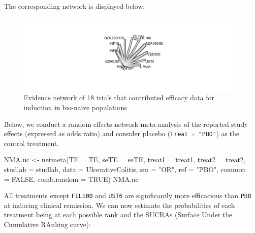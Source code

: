 \documentclass[
  letterpaper,
  DIV=11,
  numbers=noendperiod]{scrreprt}
\newenvironment{Shaded}{\begin{snugshade}}{\end{snugshade}}
\newcommand{\AttributeTok}[1]{\textcolor[rgb]{0.40,0.45,0.13}{#1}}
\newcommand{\CommentTok}[1]{\textcolor[rgb]{0.37,0.37,0.37}{#1}}
\newcommand{\ConstantTok}[1]{\textcolor[rgb]{0.56,0.35,0.01}{#1}}
\newcommand{\DecValTok}[1]{\textcolor[rgb]{0.68,0.00,0.00}{#1}}
\newcommand{\FunctionTok}[1]{\textcolor[rgb]{0.28,0.35,0.67}{#1}}
\newcommand{\NormalTok}[1]{\textcolor[rgb]{0.00,0.23,0.31}{#1}}
\newcommand{\OtherTok}[1]{\textcolor[rgb]{0.00,0.23,0.31}{#1}}
\newcommand{\SpecialCharTok}[1]{\textcolor[rgb]{0.37,0.37,0.37}{#1}}
\newcommand{\StringTok}[1]{\textcolor[rgb]{0.13,0.47,0.30}{#1}}
\begin{document}
The corresponding network is displayed below:

\begin{figure}

{\centering \includegraphics{chapter_10_files/figure-pdf/unnamed-chunk-27-1.pdf}

}

\caption{Evidence network of 18 trials that contributed efficacy data
for induction in bio-naive populations}

\end{figure}

Below, we conduct a random effects network meta-analysis of the reported
study effects (expressed as odds ratio) and consider placebo
(\texttt{treat\ =\ "PBO"}) as the control treatment.

\begin{Shaded}
\begin{Highlighting}[]
\NormalTok{NMA.uc }\OtherTok{\textless{}{-}} \FunctionTok{netmeta}\NormalTok{(}\AttributeTok{TE =}\NormalTok{ TE, }\AttributeTok{seTE =}\NormalTok{ seTE, }\AttributeTok{treat1 =}\NormalTok{ treat1, }\AttributeTok{treat2 =}\NormalTok{ treat2,}
                  \AttributeTok{studlab =}\NormalTok{ studlab, }\AttributeTok{data =}\NormalTok{ UlcerativeColitis, }\AttributeTok{sm =} \StringTok{"OR"}\NormalTok{, }
                  \AttributeTok{ref =} \StringTok{"PBO"}\NormalTok{, }\AttributeTok{common =} \ConstantTok{FALSE}\NormalTok{, }\AttributeTok{comb.random =} \ConstantTok{TRUE}\NormalTok{)}
\NormalTok{NMA.uc}
\end{Highlighting}
\end{Shaded}

All treatments except \texttt{FIL100} and \texttt{UST6} are
significantly more efficacious than \texttt{PBO} at inducing clinical
remission. We can now estimate the probabilities of each treatment being
at each possible rank and the SUCRAs (Surface Under the Cumulative
RAnking curve):

\begin{Shaded}
\end{Shaded}
\end{document}

